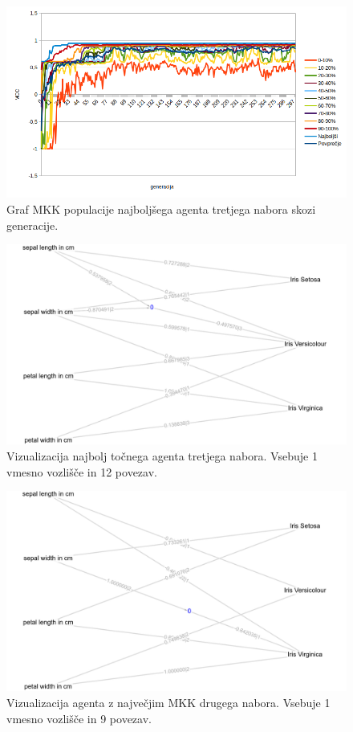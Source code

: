 \begin{figure}[H]
    \begin{center}
        \includegraphics[width=13cm]{iris/3/mcc}
    \end{center}
    \caption{Graf MKK populacije najboljšega agenta tretjega nabora skozi generacije.}
    \label{fig:iris_mcc_3}
\end{figure}

\begin{figure}[H]
    \begin{center}
        \includegraphics[width=13cm]{iris/3/acc_g}
    \end{center}
    \caption{Vizualizacija najbolj točnega agenta tretjega nabora. Vsebuje 1 vmesno vozlišče in 12 povezav.}
    \label{fig:iris_acc_3_g}
\end{figure}

\begin{figure}[H]
    \begin{center}
        \includegraphics[width=13cm]{iris/3/mcc_g}
    \end{center}
    \caption{Vizualizacija agenta z največjim MKK drugega nabora. Vsebuje 1 vmesno vozlišče in 9 povezav.}
    \label{fig:iris_mcc_3_g}
\end{figure}